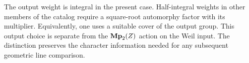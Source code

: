 The output weight is integral in the present case.
Half-integral weights in other members of the catalog require a
square-root automorphy factor with its multiplier.
Equivalently, one uses a suitable cover of the output group.
This output choice is separate from the \(\mathbf{Mp}_2(Z)\) action on
the Weil input.  The distinction preserves the character
information needed for any subsequent geometric line comparison.
